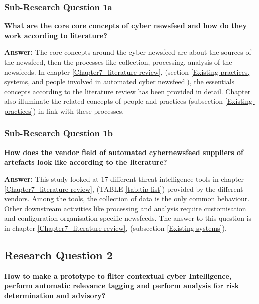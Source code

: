  \subsubsection{Sub-Research Question 1a}
\textbf{What are the core core concepts of cyber newsfeed and how do they work according to literature?}

\bigbreak

\textbf{Answer: } The core concepts around the cyber newsfeed are about the sources of the newsfeed, 
then the processes like collection, processing, analysis of the newsfeeds. 
In chapter \ref{Chapter7_literature-review},  
(section \ref{Existing practices, systems, and people involved in automated cyber newsfeed}), 
the essentials concepts according to the literature review has been provided in detail.
Chapter   also illuminate the related concepts of people and practices
(subsection \ref{Existing-practices}) in link with these processes. 

 
\subsubsection{Sub-Research Question 1b}
\textbf{How does the vendor field of automated cybernewsfeed suppliers of artefacts look like according to the literature?}

\bigbreak

\textbf{Answer: } This study looked at 17 different threat intelligence tools in chapter \ref{Chapter7_literature-review},  (TABLE \ref{tab:tip-list}) provided by the different vendors. Among the tools, the collection of data is the only common behaviour. Other downstream activities like processing and analysis require customisation and configuration organisation-specific newsfeeds. The answer to this question is  in chapter \ref{Chapter7_literature-review},  (subsection \ref{Existing systems}).
 



 \subsection{Research Question 2}
 \textbf{How to make a prototype to filter contextual cyber Intelligence,
 perform automatic relevance tagging and 
 perform analysis for risk determination and advisory?}
 
